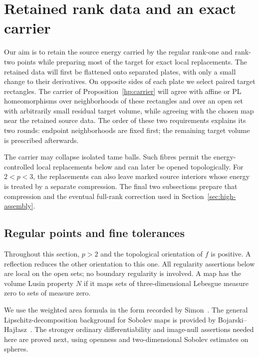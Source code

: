 \documentclass[11pt]{article}
\numberwithin{equation}{section}
\theoremstyle{definition}
\theoremstyle{remark}
\begin{document}
\tableofcontents
\section{Retained rank data and an exact carrier}\label{sec:high-preparation}

Our aim is to retain the source energy carried by the regular rank-one
and rank-two points while preparing most of the target for exact local
replacements.  The retained data will first be flattened onto separated
plates, with only a small change to their derivatives.  On opposite
sides of each plate we select paired target rectangles.  The carrier
of Proposition~\ref{hp:carrier} will agree with affine or PL
homeomorphisms over neighborhoods of these rectangles and over an open
set with arbitrarily small residual target volume, while agreeing with
the chosen map near the retained source data.  The order of
these two requirements explains its two rounds: endpoint neighborhoods
are fixed first; the remaining target volume is prescribed afterwards.

The carrier may collapse isolated tame balls.  Such fibres permit the
energy-controlled local replacements below and can later be opened
topologically.  For $2<p<3$, the replacements can also leave marked
source interiors whose energy is treated by a separate compression.
The final two subsections prepare that compression and the eventual
full-rank correction used in Section~\ref{sec:high-assembly}.

\subsection{Regular points and fine tolerances}

Throughout this section, $p>2$ and the topological orientation of $f$
is positive.  A reflection reduces the other
orientation to this one.  All regularity assertions below are local on
the open sets; no boundary regularity is involved.  A map has the volume
Lusin property $N$ if it maps sets of three-dimensional Lebesgue
measure zero to sets of measure zero.

We use the weighted area formula in the form recorded by
Simon~\cite[Chapter~2, Section~3, Equations~(3.4)--(3.5)]{Simon2014Draft}.
The general Lipschitz-decomposition background for Sobolev maps is
provided by Bojarski--Haj\l asz~\cite[Theorem~3(1)]{BojarskiHajlasz1993}.
The stronger ordinary differentiability and image-null assertions
needed here are proved next, using openness and two-dimensional
Sobolev estimates on spheres.
\end{document}
